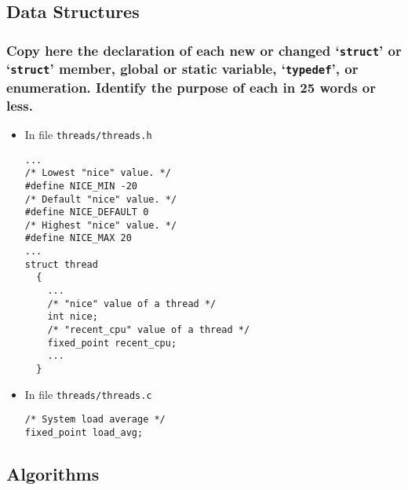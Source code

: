 \documentclass[sigconf, nonacm]{acmart}
\begin{document}
        \subsection{Data Structures}
            
            \subsubsection{Copy here the declaration of each new or changed `\texttt{struct}' or `\texttt{struct}' member, global or static variable, `\texttt{typedef}', or enumeration. Identify the purpose of each in 25 words or less. } 

                \begin{itemize}
                    \item In file \texttt{threads/threads.h}
\begin{verbatim}
...
/* Lowest "nice" value. */
#define NICE_MIN -20
/* Default "nice" value. */
#define NICE_DEFAULT 0
/* Highest "nice" value. */
#define NICE_MAX 20
...
struct thread
  {
    ...
    /* "nice" value of a thread */
    int nice;
    /* "recent_cpu" value of a thread */
    fixed_point recent_cpu;
    ...
  }\end{verbatim}
                    \item In file \texttt{threads/threads.c}
\begin{verbatim}
/* System load average */
fixed_point load_avg;\end{verbatim}
                \end{itemize}

        \subsection{Algorithms}
\end{document}

